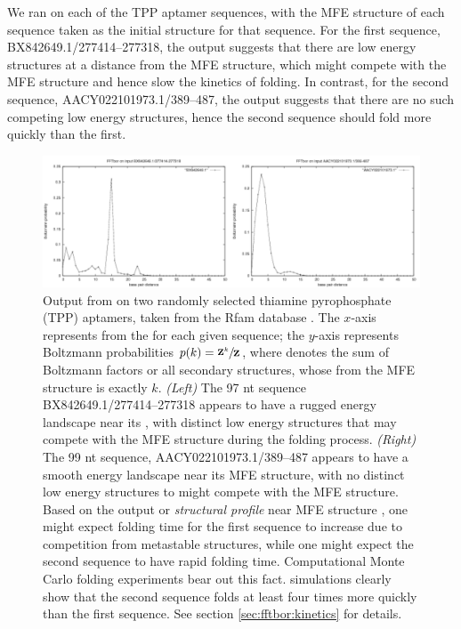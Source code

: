 We ran \fftbor on each of the TPP \rb aptamer
sequences, with the MFE structure of each
sequence taken as the initial structure \strSt for that sequence. For the
first sequence, BX842649.1/277414--277318, the \fftbor output
suggests that there are low energy structures
at a distance from the MFE structure, which might compete with the MFE
structure and hence slow the kinetics of folding. In contrast, for the
second sequence, AACY022101973.1/389--487, the \fftbor output suggests
that there are no such competing low energy structures, hence
the second sequence should fold more quickly than the first.

\begin{figure}[!ht]
\centering
\includegraphics[width=.9\textwidth]{Figures/FFTbor/tppDistributions.pdf}
\caption{Output from \fftbor on two randomly selected
thiamine pyrophosphate \rb (TPP) aptamers, taken from the Rfam database
\citep{Gardner.nar11}. The $x$-axis represents \bpd from the
\mfes for each given sequence; the $y$-axis represents
Boltzmann probabilities $p(k) = \sfrac{{\bf Z}^{k}_{}}{{\bf Z}^{}_{}}$, where
 denotes the sum of Boltzmann factors or all secondary structures,
whose \bpd from the MFE structure is exactly $k$.
{\em (Left)}
The 97 nt sequence BX842649.1/277414--277318 appears to have a rugged energy
landscape near its \mfes, with distinct
low energy structures that may compete with the MFE structure during the
folding process.
{\em (Right)}
The 99 nt sequence, AACY022101973.1/389--487 appears to have a smooth energy
landscape near its MFE structure, with no distinct low energy structures
to might compete with the MFE structure.
Based on the \fftbor output or {\em structural profile} near MFE
structure \strSt, one might expect
folding time for the first sequence to increase due to competition from
metastable structures, while one might expect the second sequence to have
rapid folding time.
Computational Monte Carlo folding experiments bear out this fact.
\kinfold \citep{flamm} simulations clearly show that the second
sequence folds
at least four times more quickly than the first sequence. See section
\ref{sec:fftbor:kinetics} for
details.}
\label{fig:fftbor:tppDistributions}
\end{figure}

